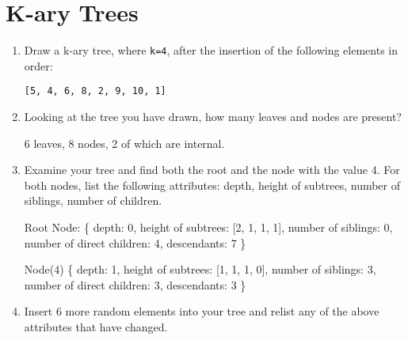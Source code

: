 \documentclass[11pt]{article}
\begin{document}
    \section{K-ary Trees}
    \begin{enumerate}
        \item Draw a k-ary tree, where \verb|k=4|, after the insertion of the following elements in order: 
        
        \verb|[5, 4, 6, 8, 2, 9, 10, 1]|

        
        \item Looking at the tree you have drawn, how many leaves and nodes are present? 

        6 leaves, 8 nodes, 2 of which are internal.
        
        \item Examine your tree and find both the root and the node with the value 4. For both nodes, list the following attributes: depth, height of subtrees, number of siblings, number of children. 

        Root Node: \{ depth: 0, height of subtrees: [2, 1, 1, 1], number of siblings: 0, number of direct children: 4, descendants: 7 \}

        Node(4) \{ depth: 1, height of subtrees: [1, 1, 1, 0], number of siblings: 3, number of direct children: 3, descendants: 3 \}
        
        \item Insert 6 more random elements into your tree and relist any of the above attributes that have changed.



\end{enumerate}
\end{document}

